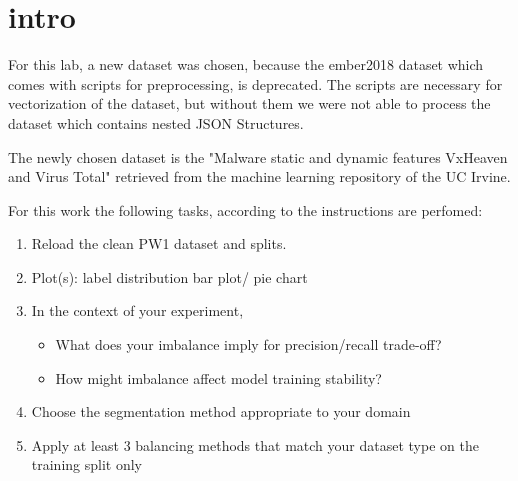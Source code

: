 \section{intro}

For this lab, a new dataset was chosen, because the ember2018 dataset which comes with scripts for preprocessing, is deprecated.
The scripts are necessary for vectorization of the dataset, but without them we were not able to process the dataset which contains nested JSON Structures.

The newly chosen dataset is the "Malware static and dynamic features VxHeaven and Virus Total" retrieved from the machine learning repository of the UC Irvine. \parencite{UCI2019dataset}

\vspace{1cm}
For this work the following tasks, according to the instructions are perfomed:
\begin{enumerate}
\item Reload the clean PW1 dataset and splits.
\item Plot(s): label distribution bar plot/ pie chart
\item In the context of your experiment,
\begin{itemize}
    \item What does your imbalance imply for precision/recall trade-off?
    \item How might imbalance affect model training stability?
\end{itemize}
\item Choose the segmentation method appropriate to your domain
\item Apply at least 3 balancing methods that match your dataset type on the training split only
\end{enumerate}